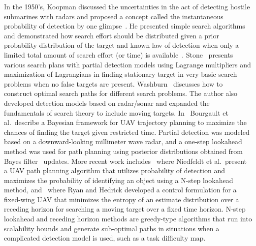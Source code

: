 In the 1950's, Koopman discussed the uncertainties in the act of detecting hostile submarines with radars and proposed a concept called the instantaneous probability of detection by one glimpse~\cite{Koopman1956Theory}. He presented simple search algorithms and demonstrated how search effort should be distributed given a prior probability distribution of the target and known law of detection when only a limited total amount of search effort (or time) is available~\cite{Koopman1957Theory}. Stone~\cite{Stone1975Theory} presents various search plans with partial detection models using Lagrange multipliers and maximization of Lagrangians in finding stationary target in very basic search problems when no false targets are present. Washburn~\cite{Washburn1981Search} discusses how to construct optimal search paths for different search problems. The author also developed detection models based on radar/sonar and expanded the fundamentals of search theory to include moving targets. In~\cite{Bourgault2006Optimal} Bourgault et al.\ describe a Bayesian framework for UAV trajectory planning to maximize the chances of finding the target given restricted time. Partial detection was modeled based on a downward-looking millimeter wave radar, and a one-step lookahead method was used for path planning using posterior distributions obtained from Bayes filter~\cite{Thrun2005Probabilistic} updates. More recent work includes~\cite{Niedfeldt2010integrated} where Niedfeldt et al.\ present a UAV path planning algorithm that utilizes probability of detection and maximizes the probability of identifying an object using a N-step lookahead method, and~\cite{Ryan2010particle} where Ryan and Hedrick developed a control formulation for a fixed-wing UAV that minimizes the entropy of an estimate distribution over a receding horizon for searching a moving target over a fixed time horizon. N-step lookahead and receding horizon methods are greedy-type algorithms that run into scalability bounds and generate sub-optimal paths in situations when a complicated detection model is used, such as a task difficulty map.

